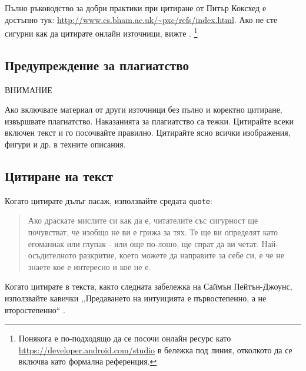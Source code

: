 Пълно ръководство за добри практики при цитиране от Питър Коксхед е достъпно тук: \url{http://www.cs.bham.ac.uk/~pxc/refs/index.html}.
Ако не сте сигурни как да цитирате онлайн източници, вижте \citet{UNSWWebsite}.
\footnote{Понякога е по-подходящо да се посочи онлайн ресурс като \url{https://developer.android.com/studio}
в бележка под линия, отколкото да се включва като формална референция.}

\subsection{Предупреждение за плагиатство}

\begin{highlight_title}{ВНИМАНИЕ}
    
    Ако включвате материал от други източници без пълно и коректно цитиране, извършвате плагиатство. Наказанията за плагиатство са тежки.
    Цитирайте всеки включен текст и го посочвайте правилно. Цитирайте ясно всички изображения, фигури и др. в техните описания.
\end{highlight_title}

\subsection{Цитиране на текст}

Когато цитирате дълъг пасаж, използвайте средата \texttt{quote}:

\begin{quote}
    Ако драскате мислите си как да е, читателите със сигурност ще почувстват, че изобщо не ви е грижа за тях. Те ще ви определят като егоманиак или глупак - или още по-лошо, ще спрат да ви четат. Най-осъдителното разкритие, което можете да направите за себе си, е че не знаете кое е интересно и кое не е.
\end{quote} \citep{Von80}

Когато цитирате в текста, както следната забележка на Саймън Пейтън-Джоунс, използвайте кавички ,,Предаването на интуицията е първостепенно, а не второстепенно`` \citep{Pey17}.